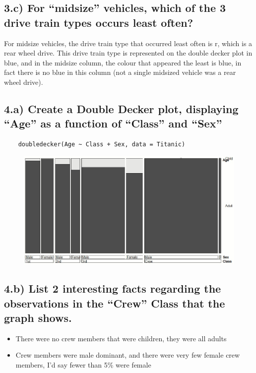 \documentclass[11pt]{article}
\begin{document}
\subsection*{3.c)  For “midsize” vehicles, which of the 3 drive train types occurs least often?}
For midsize vehicles, the drive train type that occurred least often is r, which is a rear wheel drive. This drive train type is represented on the double decker plot in blue, and in the midsize column, the colour that appeared the least is blue, in fact there is no blue in this column (not a single midsized vehicle was a rear wheel drive).

\subsection*{4.a) Create a Double Decker plot, displaying “Age” as a function of “Class” and “Sex”}
\begin{verbatim}
    doubledecker(Age ~ Class + Sex, data = Titanic)
\end{verbatim}

\begin{figure}[h]
\includegraphics[width = 17cm]{4a.jpg}
\centering
\end{figure}

\newpage

\subsection*{4.b) List 2 interesting facts regarding the observations in the “Crew” Class that the graph shows.}

\begin{itemize}
    \item There were no crew members that were children, they were all adults  
    \item Crew members were male dominant, and there were very few female crew members, I'd say fewer than 5\% were female
\end{itemize}
\end{document}
